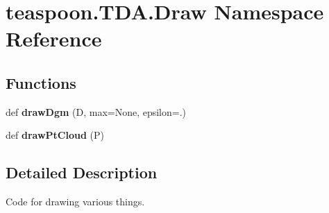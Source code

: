 \hypertarget{namespaceteaspoon_1_1_t_d_a_1_1_draw}{}\section{teaspoon.\+T\+D\+A.\+Draw Namespace Reference}
\label{namespaceteaspoon_1_1_t_d_a_1_1_draw}
\subsection*{Functions}
\begin{DoxyCompactItemize}
\item 
def {\bfseries draw\+Dgm} (D, max=None, epsilon=.)\hypertarget{namespaceteaspoon_1_1_t_d_a_1_1_draw_a7325ffa8f9e2955eb9bb40c45da477b3}{}\label{namespaceteaspoon_1_1_t_d_a_1_1_draw_a7325ffa8f9e2955eb9bb40c45da477b3}

\item 
def {\bfseries draw\+Pt\+Cloud} (P)\hypertarget{namespaceteaspoon_1_1_t_d_a_1_1_draw_a204ad8c5e5fe84b51ab43fef94eb6645}{}\label{namespaceteaspoon_1_1_t_d_a_1_1_draw_a204ad8c5e5fe84b51ab43fef94eb6645}

\end{DoxyCompactItemize}


\subsection{Detailed Description}
\begin{DoxyVerb}Code for drawing various things.\end{DoxyVerb}
 